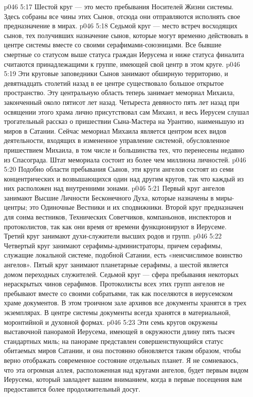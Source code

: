 \vs p046 5:17 Шестой круг --- это место пребывания Носителей Жизни системы. Здесь собраны все чины этих Сынов, отсюда они отправляются исполнять свое предназначение в мирах.
\vs p046 5:18 Седьмой круг --- место встреч восходящих сынов, тех получивших назначение сынов, которые могут временно действовать в центре системы вместе со своими серафимами\hyp{}союзницами. Все бывшие смертные со статусом выше статуса граждан Иерусема и ниже статуса финалита считаются принадлежащими к группе, имеющей свой центр в этом круге.
\vs p046 5:19 Эти круговые заповедники Сынов занимают обширную территорию, и девятнадцать столетий назад в ее центре существовало большое открытое пространство. Эту центральную область теперь занимает мемориал Михаила, законченный около пятисот лет назад. Четыреста девяносто пять лет назад при освящении этого храма лично присутствовал сам Михаил, и весь Иерусем слушал трогательный рассказ о пришествии Сына\hyp{}Мастера на Урантию, наименьшую из миров в Сатании. Сейчас мемориал Михаила является центром всех видов деятельности, входящих в измененное управление системой, обусловленное пришествием Михаила, в том числе и большинства тех, что перенесены недавно из Спасограда. Штат мемориала состоит из более чем миллиона личностей.
\vs p046 5:20 \pc {}\bibnobreakspace {} Подобно области пребывания Сынов, эти круги ангелов состоят из семи концентрических и возвышающихся один над другим кругов, так что каждый из них расположен над внутренними зонами.
\vs p046 5:21 \pc Первый круг ангелов занимают Высшие Личности Бесконечного Духа, которые назначены в миры\hyp{}центры; это Одиночные Вестники и их сподвижники. Второй круг предназначен для сонма вестников, Технических Советчиков, компаньонов, инспекторов и протоколистов, так как они время от времени функционируют в Иерусеме. Третий круг занимают духи\hyp{}служители высших родов и групп.
\vs p046 5:22 Четвертый круг занимают серафимы\hyp{}администраторы, причем серафимы, служащие локальной системе, подобной Сатании, есть «неисчислимое воинство ангелов». Пятый круг занимают планетарные серафимы, а шестой является домом переходных служителей. Седьмой круг --- сфера пребывания некоторых нераскрытых чинов серафимов. Протоколисты всех этих групп ангелов не пребывают вместе со своими собратьями, так как поселяются в иерусемском храме документов. В этом троичном зале архивов все документы хранятся в трех экземплярах. В центре системы документы всегда хранятся в материальной, моронтийной и духовной формах.
\vs p046 5:23 Эти семь кругов окружены выставочной панорамой Иерусема, имеющей в окружности длину пять тысяч стандартных миль; на панораме представлен совершенствующийся статус обитаемых миров Сатании, и она постоянно обновляется таким образом, чтобы верно отображать современное состояние отдельных планет. Я не сомневаюсь, что эта огромная аллея, расположенная над кругами ангелов, будет первым видом Иерусема, который завладеет вашим вниманием, когда в первые посещения вам предоставится более продолжительный досуг.
